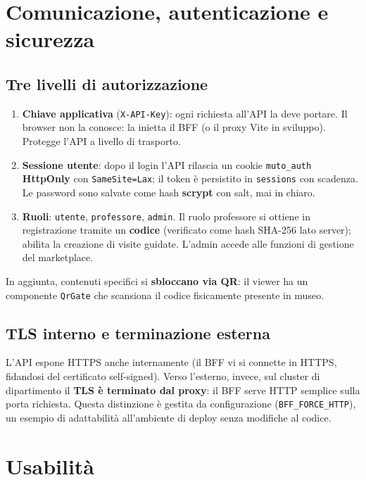 \documentclass[11pt,a4paper]{article}
\newcommand{\code}[1]{\texttt{#1}}
\begin{document}
\section{Comunicazione, autenticazione e sicurezza}

\subsection{Tre livelli di autorizzazione}
\begin{enumerate}[leftmargin=1.5em]
  \item \textbf{Chiave applicativa} (\code{X-API-Key}): ogni richiesta all'API la
    deve portare. Il browser non la conosce: la inietta il BFF (o il proxy Vite
    in sviluppo). Protegge l'API a livello di trasporto.
  \item \textbf{Sessione utente}: dopo il login l'API rilascia un cookie
    \code{muto\_auth} \textbf{HttpOnly} con \code{SameSite=Lax}; il token è
    persistito in \code{sessions} con scadenza. Le password sono salvate come
    hash \textbf{scrypt} con salt, mai in chiaro.
  \item \textbf{Ruoli}: \code{utente}, \code{professore}, \code{admin}. Il ruolo
    professore si ottiene in registrazione tramite un \textbf{codice} (verificato
    come hash SHA-256 lato server); abilita la creazione di visite guidate.
    L'admin accede alle funzioni di gestione del marketplace.
\end{enumerate}
In aggiunta, contenuti specifici si \textbf{sbloccano via QR}: il viewer ha un
componente \code{QrGate} che scansiona il codice fisicamente presente in museo.

\subsection{TLS interno e terminazione esterna}
L'API espone HTTPS anche internamente (il BFF vi si connette in HTTPS, fidandosi
del certificato self-signed). Verso l'esterno, invece, sul cluster di
dipartimento il \textbf{TLS è terminato dal proxy}: il BFF serve HTTP semplice
sulla porta richiesta. Questa distinzione è gestita da configurazione
(\code{BFF\_FORCE\_HTTP}), un esempio di adattabilità all'ambiente di deploy
senza modifiche al codice.

\section{Usabilità}
\end{document}

